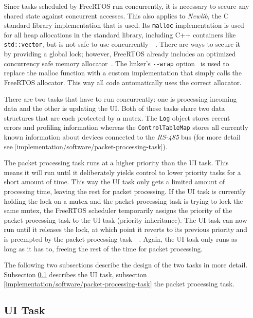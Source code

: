 Since tasks scheduled by FreeRTOS run concurrently, it is necessary to secure any shared state against
concurrent accesses. This also applies to \textit{Newlib}, the C standard library implementation
that is used. Its \lstinline{malloc} implementation is used for all heap allocations in the standard
library, including C++ containers like \mbox{\lstinline{std::vector},} but is not safe to use concurrently~\
\cite{newlib-malloc-lock}. There are ways to secure it by providing a global lock; however, FreeRTOS
already includes an optimized concurrency safe memory allocator~\cite{freertos-allocators}. The linker's
\lstinline{--wrap} option~\cite{arm-none-eabi-ld-manpage} is used to replace the malloc function with
a custom implementation that simply calls the FreeRTOS allocator. This way all code automatically
uses the correct allocator.

There are two tasks that have to run concurrently: one is processing incoming data and the other is
updating the UI. Both of these tasks share two data structures that are each protected by a mutex.
The \lstinline{Log} object stores recent errors and profiling information whereas the
\lstinline{ControlTableMap} stores all currently known information about devices connected to the
\textit{RS-485} bus (for more detail see \ref{implementation/software/packet-processing-task}).

The packet processing task runs at a higher priority than the UI task. This means it will run until
it deliberately yields control to lower priority tasks for a short amount of time. This way the UI
task only gets a limited amount of processing time, leaving the rest for packet processing. If the
UI task is currently holding the lock on a mutex and the packet processing task is trying to lock the
same mutex, the FreeRTOS scheduler temporarily assigns the priority of the packet processing task
to the UI task (priority inheritance). The UI task can now run until it releases the lock, at which
point it reverts to its previous priority and is preempted by the packet processing task~\
\cite{freertos-create-mutex-docs}. Again, the UI task only runs as long as it has to, freeing the
rest of the time for packet processing.

The following two subsections describe the design of the two tasks in more detail. Subsection
\ref{implementation/software/ui-task} describes the UI task, subsection
\ref{implementation/software/packet-processing-task} the packet processing task.

\subsection{UI Task}
\label{implementation/software/ui-task}

